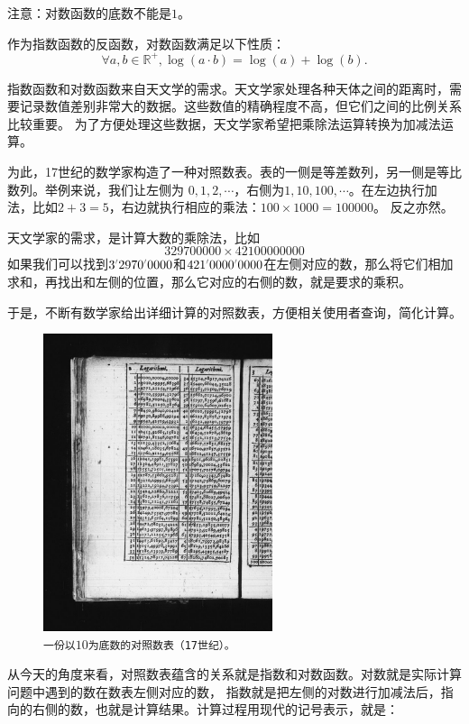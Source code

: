 \documentclass[12pt,UTF8]{ctexbook}
\newcommand{\dlim}[1]{^{\color{gray}\prime}#1}
\begin{document}
注意：对数函数的底数不能是$1$。

作为指数函数的反函数，对数函数满足以下性质：
$$ \forall a, b\in\mathbb{R}^+, \log(a\cdot b) = \log(a) + \log(b). $$

指数函数和对数函数来自天文学的需求。天文学家处理各种天体之间的距离时，需要记录数值差别非常大的数据。这些数值的精确程度不高，但它们之间的比例关系比较重要。
为了方便处理这些数据，天文学家希望把乘除法运算转换为加减法运算。

为此，17世纪的数学家构造了一种对照数表。表的一侧是等差数列，另一侧是等比数列。举例来说，我们让左侧为
$0,1,2,\cdots$，右侧为$1, 10, 100, \cdots$。在左边执行加法，比如$2+3=5$，右边就执行相应的乘法：$100 \times 1000 = 100000$。
反之亦然。

天文学家的需求，是计算大数的乘除法，比如
$$329700000 \times 42100000000$$
如果我们可以找到$3\dlim{2970}\dlim{0000}$和$421\dlim{0000}\dlim{0000}$在左侧对应的数，那么将它们相加求和，再找出和左侧的位置，那么它对应的右侧的数，就是要求的乘积。

于是，不断有数学家给出详细计算的对照数表，方便相关使用者查询，简化计算。

\begin{figure}[h]
    \vspace{4pt}
    \centering
    \includegraphics[width=0.6\textwidth]{tu/Logarithmorum_Chilias_Prima_page_0-67.jpg}
    \caption*{\texttt{一份以}$10$\texttt{为底数的对照数表（17世纪）。}}
\end{figure}

从今天的角度来看，对照数表蕴含的关系就是指数和对数函数。对数就是实际计算问题中遇到的数在数表左侧对应的数，
指数就是把左侧的对数进行加减法后，指向的右侧的数，也就是计算结果。计算过程用现代的记号表示，就是：
\end{document}
